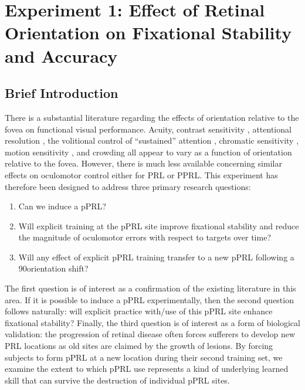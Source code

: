 \chapter{Experiment 1: Effect of Retinal Orientation on Fixational Stability and Accuracy}

\section{Brief Introduction}

There is a substantial literature regarding the effects of orientation relative to the fovea on functional visual performance. Acuity, contrast sensitivity \citep{skrandies_1987}, attentional resolution \citep{rezec_2004}, the volitional control of ``sustained'' attention  \citep{mackeben_1999,altpeter_2000}, chromatic sensitivity \citep{levine_2005}, motion sensitivity \citep{levine_2005,edwards_1993}, and crowding \citep{he_1996} all appear to vary as a function of orientation relative to the fovea. However, there is much less available concerning similar effects on oculomotor control either for PRL or PPRL. This experiment has therefore been designed to address three primary research questions:

\begin{enumerate}
\item Can we induce a pPRL?
\item Will explicit training at the pPRL site improve fixational stability and reduce the magnitude of oculomotor errors with respect to targets over time?
\item Will any effect of explicit pPRL training transfer to a new pPRL following a 90\degree orientation shift?
\end{enumerate}

The first question is of interest as a confirmation of the existing literature in this area. If it is possible to induce a pPRL experimentally, then the second question follows naturally: will explicit practice with/use of this pPRL site enhance fixational stability? Finally, the third question is of interest as a form of biological validation: the progression of retinal disease often forces sufferers to develop new PRL locations as old sites are claimed by the growth of lesions. By forcing subjects to form pPRL at a new location during their second training set, we examine the extent to which pPRL use represents a kind of underlying learned skill that can survive the destruction of individual pPRL sites.


